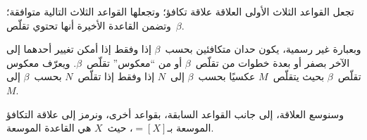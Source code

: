 \documentclass[../../../include/open-logic-section]{subfiles}
\begin{document}
تجعل القواعد الثلاث الأولى العلاقة علاقة تكافؤ؛ وتجعلها القواعد الثلاث
التالية متوافقة؛ وتضمن القاعدة الأخيرة أنها تحتوي تقلّص~$\beta$.

وبعبارة غير رسمية، يكون حدان متكافئين بحسب~$\beta$ إذا وفقط إذا أمكن
تغيير أحدهما إلى الآخر بصفر أو بعدة خطوات من تقلّص~$\beta$ أو من
``معكوس'' تقلّص~$\beta$. ويعرّف معكوس تقلّص~$\beta$ بحيث يتقلّص~$M$
عكسيًا بحسب~$\beta$ إلى~$N$ إذا وفقط إذا تقلّص~$N$ بحسب~$\beta$ إلى
$M$.

وسنوسع العلاقة، إلى جانب القواعد السابقة، بقواعد أخرى، ونرمز إلى علاقة
التكافؤ الموسعة بـ$\equal[X]$، حيث~$X$ هي القاعدة الموسعة.
\end{document}
